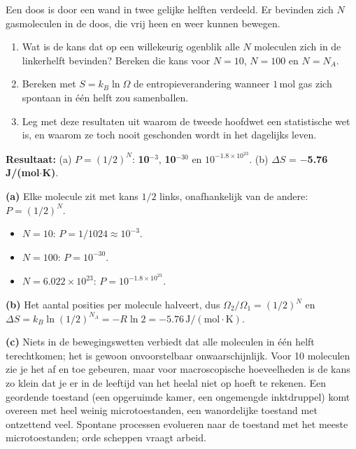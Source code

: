\begin{oefening}
Een doos is door een wand in twee gelijke helften verdeeld. Er bevinden zich \(N\) gasmoleculen in de doos, die vrij heen en weer kunnen bewegen.

\begin{enumerate}
\item[(a)]
  Wat is de kans dat op een willekeurig ogenblik alle \(N\) moleculen zich in de linkerhelft bevinden? Bereken die kans voor \(N = 10\), \(N = 100\) en \(N = N_A\).
\item[(b)]
  Bereken met \(S = k_B\ln\Omega\) de entropieverandering wanneer \(1\,\mathrm{mol}\) gas zich spontaan in één helft zou samenballen.
\item[(c)]
  Leg met deze resultaten uit waarom de tweede hoofdwet een statistische wet is, en waarom ze toch nooit geschonden wordt in het dagelijks leven.
\end{enumerate}
\end{oefening}
\begin{oplossing}
\textbf{Resultaat:} (a) \(P = (1/2)^N\): \textbf{10\ensuremath{^{-3}}}, \textbf{10\ensuremath{^{-30}}} en \(10^{-1.8\times10^{23}}\). (b) \(\Delta S\) = \textbf{\ensuremath{-}5.76 J/(mol\ensuremath{\cdot{}}K)}.

\textbf{(a)} Elke molecule zit met kans \(1/2\) links, onafhankelijk van de andere: \(P = (1/2)^N\).

\begin{itemize}
\item
  \(N = 10\): \(P = 1/1024 \approx 10^{-3}\).
\item
  \(N = 100\): \(P = 10^{-30}\).
\item
  \(N = 6.022\times10^{23}\): \(P = 10^{-1.8\times10^{23}}\).
\end{itemize}

\textbf{(b)} Het aantal posities per molecule halveert, dus \(\Omega_2/\Omega_1 = (1/2)^{N}\) en \(\Delta S = k_B\ln(1/2)^{N_A} = -R\ln 2 = -5.76\,\mathrm{J/(mol\cdot K)}\).

\textbf{(c)} Niets in de bewegingswetten verbiedt dat alle moleculen in één helft terechtkomen; het is gewoon onvoorstelbaar onwaarschijnlijk. Voor 10 moleculen zie je het af en toe gebeuren, maar voor macroscopische hoeveelheden is de kans zo klein dat je er in de leeftijd van het heelal niet op hoeft te rekenen. Een geordende toestand (een opgeruimde kamer, een ongemengde inktdruppel) komt overeen met heel weinig microtoestanden, een wanordelijke toestand met ontzettend veel. Spontane processen evolueren naar de toestand met het meeste microtoestanden; orde scheppen vraagt arbeid.
\end{oplossing}

